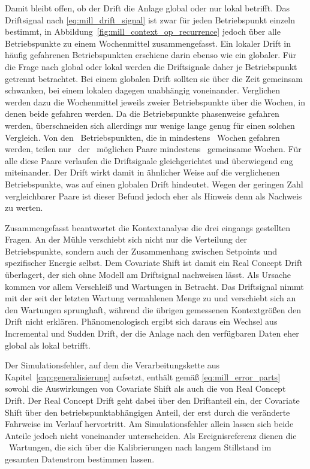 Damit bleibt offen, ob der Drift die Anlage global oder nur lokal betrifft. Das Driftsignal nach \eqref{eq:mill_drift_signal} ist zwar für jeden Betriebspunkt einzeln bestimmt, in Abbildung~\ref{fig:mill_context_op_recurrence} jedoch über alle Betriebspunkte zu einem Wochenmittel zusammengefasst. Ein lokaler Drift in häufig gefahrenen Betriebspunkten erschiene darin ebenso wie ein globaler. Für die Frage nach global oder lokal werden die Driftsignale daher je Betriebspunkt getrennt betrachtet. Bei einem globalen Drift sollten sie über die Zeit gemeinsam schwanken, bei einem lokalen dagegen unabhängig voneinander. Verglichen werden dazu die Wochenmittel jeweils zweier Betriebspunkte über die Wochen, in denen beide gefahren werden. Da die Betriebspunkte phasenweise gefahren werden, überschneiden sich allerdings nur wenige lange genug für einen solchen Vergleich. Von den \millCtxOpCorrNOps~Betriebspunkten, die in mindestens \millCtxOpCorrMinWeeks~Wochen gefahren werden, teilen nur \millCtxOpCorrNPairs~der \millCtxOpCorrNPairsAll~möglichen Paare mindestens \millCtxOpCorrMinOverlap~gemeinsame Wochen. Für alle diese Paare verlaufen die Driftsignale gleichgerichtet und überwiegend eng miteinander. Der Drift wirkt damit in ähnlicher Weise auf die verglichenen Betriebspunkte, was auf einen globalen Drift hindeutet. Wegen der geringen Zahl vergleichbarer Paare ist dieser Befund jedoch eher als Hinweis denn als Nachweis zu werten. \par
%
Zusammengefasst beantwortet die Kontextanalyse die drei eingangs gestellten Fragen. An der Mühle verschiebt sich nicht nur die Verteilung der Betriebspunkte, sondern auch der Zusammenhang zwischen Setpoints und spezifischer Energie selbst. Dem Covariate Shift ist damit ein Real Concept Drift überlagert, der sich ohne Modell am Driftsignal nachweisen lässt. Als Ursache kommen vor allem Verschleiß und Wartungen in Betracht. Das Driftsignal nimmt mit der seit der letzten Wartung vermahlenen Menge zu und verschiebt sich an den Wartungen sprunghaft, während die übrigen gemessenen Kontextgrößen den Drift nicht erklären. Phänomenologisch ergibt sich daraus ein Wechsel aus Incremental und Sudden Drift, der die Anlage nach den verfügbaren Daten eher global als lokal betrifft. \par
%
Der Simulationsfehler, auf dem die Verarbeitungskette aus Kapitel~\ref{cap:generalisierung} aufsetzt, enthält gemäß \eqref{eq:mill_error_parts} sowohl die Auswirkungen von Covariate Shift als auch die von Real Concept Drift. Der Real Concept Drift geht dabei über den Driftanteil ein, der Covariate Shift über den betriebspunktabhängigen Anteil, der erst durch die veränderte Fahrweise im Verlauf hervortritt. Am Simulationsfehler allein lassen sich beide Anteile jedoch nicht voneinander unterscheiden. Als Ereignisreferenz dienen die \millCtxNEvents~Wartungen, die sich über die Kalibrierungen nach langem Stillstand im gesamten Datenstrom bestimmen lassen. \par
%
